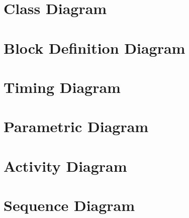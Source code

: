 \section{Class Diagram}

\section{Block Definition Diagram}

\section{Timing Diagram}

\section{Parametric Diagram}

\section{Activity Diagram}

\section{Sequence Diagram}

